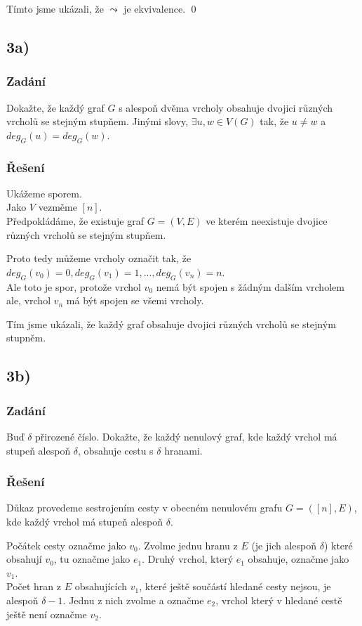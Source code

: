 \documentclass[../main.tex]{subfiles}
\begin{document}
Tímto jsme ukázali, že $\leadsto$ je ekvivalence.  
\qed


\subsection*{3a)}
\subsubsection*{Zadání}
Dokažte, že každý graf $G$ s alespoň dvěma vrcholy obsahuje dvojici různých vrcholů se stejným stupňem. Jinými slovy, $\exists u,w \in V(G)$
tak, že $u\neq w$ a $deg_G(u) = deg_G(w)$.
\subsubsection*{Řešení}

Ukážeme sporem. \\
Jako $V$ vezměme $[n]$.\\
Předpokládáme, že existuje graf $G = (V,E)$ ve kterém neexistuje dvojice různých vrcholů se stejným stupňem.

Proto tedy můžeme vrcholy označit tak, že $deg_G(v_0) = 0, deg_G(v_1) = 1, ..., deg_G(v_n)=n$.\\
Ale toto je spor, protože vrchol $v_0$ nemá být spojen s žádným dalším vrcholem ale, vrchol $v_n$ má být spojen se všemi vrcholy.

Tím jsme ukázali, že každý graf obsahuje dvojici různých vrcholů se stejným stupněm. 


\subsection*{3b)}
\subsubsection*{Zadání}
Buď $\delta$ přirozené číslo. Dokažte, že každý nenulový graf, kde každý vrchol má stupeň alespoň $\delta$, obsahuje cestu s $\delta$ hranami.
\subsubsection*{Řešení}

Důkaz provedeme sestrojením cesty v obecném nenulovém grafu $G=([n], E)$, kde každý vrchol má stupeň alespoň $\delta$.


Počátek cesty označme jako $v_0$. 
Zvolme jednu hranu z $E$ (je jich alespoň $\delta$) které obsahují $v_0$, tu označme jako $e_1$.
Druhý vrchol, který $e_1$ obsahuje, označme jako $v_1$.\\
Počet hran z $E$ obsahujících $v_1$, které ještě součástí hledané cesty nejsou, je alespoň $\delta-1$.
Jednu z nich zvolme a označme $e_2$, vrchol který v hledané cestě ještě není označme $v_2$.
\end{document}
